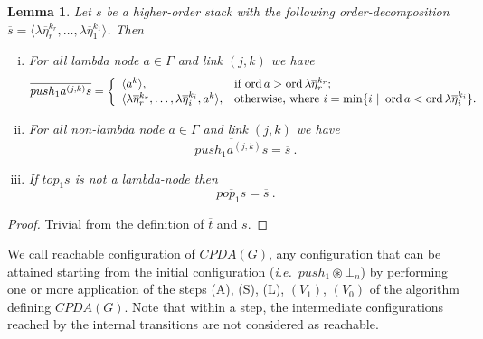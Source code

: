 \documentclass{article}
\newcommand{\ord}{\mathop{\mathrm{ord}}}
\newcommand{\theroot}{\circledast} %
\newtheorem{lemma}{Lemma}[section]
\theoremstyle{remark}
\theoremstyle{definition}
\newcommand\orddec\overline
\def\ie{{\it i.e.}\ }
\begin{document}
\begin{lemma}
\label{lem:push1pop1_orderdecompo} Let $s$ be a higher-order stack
with the following order-decomposition $\orddec{s} = \langle \lambda
\overline{\eta}_r^{k_r}, \ldots, \lambda \overline{\eta}_1^{k_1}
\rangle$. Then
\begin{enumerate}[i.]
\item For all lambda node $a \in \Gamma$ and link $(j,k)$ we have
 $$ \orddec{push_1 a^{(j,k)} s} = \left\{
                                       \begin{array}{ll}
                                        \langle a^k \rangle, &  \hbox{if $\ord{a} > \ord{\lambda \overline{\eta}_r^{k_r}}$}; \\
                                         \langle \lambda \overline{\eta}_r^{k_r}, \ldots, \lambda
\overline{\eta}_i^{k_i}, a^k \rangle, & \hbox{otherwise, where $i = \min \{ i \ | \ \ord{a} <
\ord{\lambda \overline{\eta}_i^{k_i}} \}$.}
                                       \end{array}
                                     \right.$$

\item For all non-lambda node $a \in \Gamma$ and link $(j,k)$ we have
$$ \orddec{push_1 a^{(j,k)} s} = \orddec{s} \ .$$

\item If $top_1 s$ is not a lambda-node then
$$ \orddec{pop_1 s} = \orddec{s} \ .$$
\end{enumerate}
\end{lemma}
\begin{proof}
  Trivial from the definition of $\orddec{t}$ and
  $\orddec{s}$.
\end{proof}

We call reachable configuration of $CPDA(G)$, any configuration that can be attained starting from the initial configuration (\ie $push_1 \theroot \bot_n$) by performing one or more application of the steps (A), (S), (L), $(V_1)$, $(V_0)$ of the algorithm defining $CPDA(G)$. Note that within a step, the intermediate configurations reached by the internal transitions are not considered as reachable.
\end{document}

